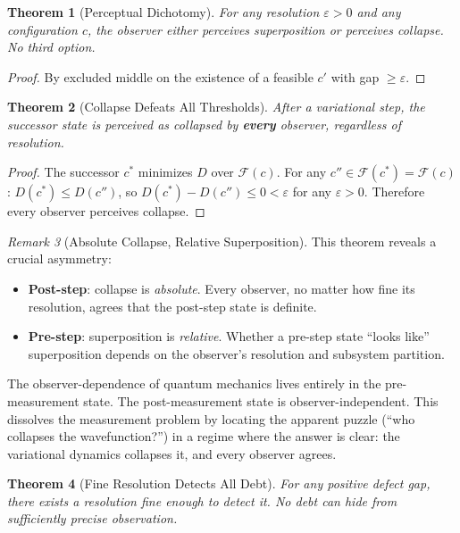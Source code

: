 \documentclass[11pt,a4paper]{article}
\theoremstyle{plain}
\newtheorem{theorem}{Theorem}[section]
\theoremstyle{definition}
\theoremstyle{remark}
\newtheorem{remark}[theorem]{Remark}
\newcommand{\F}{\mathcal{F}}
\begin{document}
\begin{theorem}[Perceptual Dichotomy]\label{thm:perceptual}
For any resolution $\varepsilon > 0$ and any configuration $c$, the observer either perceives superposition or perceives collapse.
No third option.
\end{theorem}

\begin{proof}
By excluded middle on the existence of a feasible $c'$ with gap $\ge \varepsilon$.
\end{proof}

\begin{theorem}[Collapse Defeats All Thresholds]\label{thm:defeats}
After a variational step, the successor state is perceived as collapsed by \textbf{every} observer, regardless of resolution.
\end{theorem}

\begin{proof}
The successor $c^*$ minimizes $D$ over $\F(c)$.
For any $c'' \in \F(c^*) = \F(c)$: $D(c^*) \le D(c'')$, so $D(c^*) - D(c'') \le 0 < \varepsilon$ for any $\varepsilon > 0$.
Therefore every observer perceives collapse.
\end{proof}

\begin{remark}[Absolute Collapse, Relative Superposition]
This theorem reveals a crucial asymmetry:
\begin{itemize}[nosep]
\item \textbf{Post-step}: collapse is \emph{absolute}.
Every observer, no matter how fine its resolution, agrees that the post-step state is definite.
\item \textbf{Pre-step}: superposition is \emph{relative}.
Whether a pre-step state ``looks like'' superposition depends on the observer's resolution and subsystem partition.
\end{itemize}
The observer-dependence of quantum mechanics lives entirely in the pre-measurement state.
The post-measurement state is observer-independent.
This dissolves the measurement problem by locating the apparent puzzle (``who collapses the wavefunction?'') in a regime where the answer is clear: the variational dynamics collapses it, and every observer agrees.
\end{remark}

\begin{theorem}[Fine Resolution Detects All Debt]\label{thm:fine}
For any positive defect gap, there exists a resolution fine enough to detect it.
No debt can hide from sufficiently precise observation.
\end{theorem}
\end{document}
